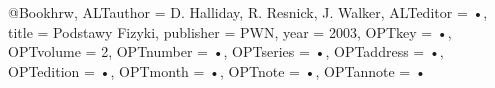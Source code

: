 @Book{hrw,
ALTauthor = {D. Halliday, R. Resnick, J. Walker},
ALTeditor = {•},
title = {Podstawy Fizyki},
publisher = {PWN},
year = {2003},
OPTkey = {•},
OPTvolume = {2},
OPTnumber = {•},
OPTseries = {•},
OPTaddress = {•},
OPTedition = {•},
OPTmonth = {•},
OPTnote = {•},
OPTannote = {•}
}
